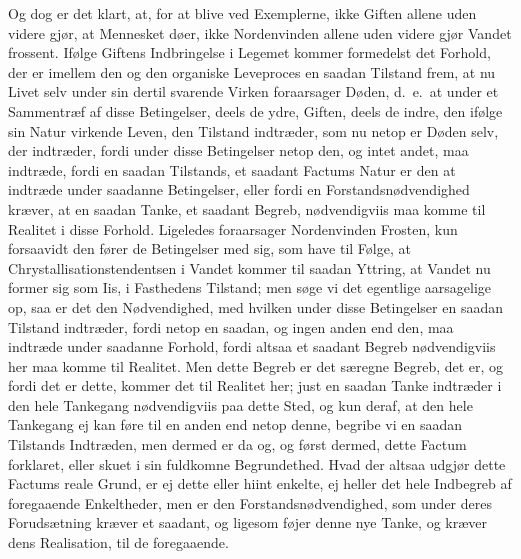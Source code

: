 \documentclass[12pt,a4paper]{book}
\newcommand{\apage}[1]{\marginnote{\footnotesize\textit{[#1]}}}
\begin{document}
Og dog er det klart, at, for at blive ved Exemplerne, ikke Giften allene uden
videre gjør, at Mennesket døer, ikke Nordenvinden allene uden videre gjør Vandet
frossent. Ifølge Giftens Indbringelse i Legemet kommer formedelst det Forhold, der
er imellem den og den organiske Leveproces en saadan Tilstand frem, at nu Livet
selv under sin dertil svarende Virken foraarsager Døden, d.\ e.\ at under et
Sammentræf af disse Betingelser, deels de ydre, Giften, deels de indre, den ifølge
sin Natur virkende Leven, den Tilstand indtræder, som nu netop er Døden selv, der
indtræder, fordi under disse Betingelser netop den, og intet andet, maa indtræde,
fordi en saadan Tilstands, et saadant Factums Natur er den at \apage{97} indtræde under saadanne Betingelser, eller fordi en Forstandsnødvendighed kræver, at en saadan Tanke, et saadant Begreb, nødvendigviis maa komme til Realitet i disse Forhold. Ligeledes foraarsager Nordenvinden Frosten, kun forsaavidt den fører de Betingelser med sig, som have til Følge, at Chrystallisationstendentsen i Vandet kommer til saadan Yttring, at Vandet nu former sig som Iis, i Fasthedens Tilstand; men søge vi det egentlige aarsagelige op, saa er det den Nødvendighed, med hvilken under disse Betingelser en saadan Tilstand indtræder, fordi netop en saadan, og ingen anden end den, maa indtræde under saadanne Forhold, fordi altsaa et saadant Begreb nødvendigviis her maa komme til Realitet. Men dette Begreb er det særegne Begreb, det er, og fordi det er dette, kommer det til Realitet her; just en saadan Tanke indtræder i den hele Tankegang nødvendigviis paa dette Sted, og kun deraf, at den hele Tankegang ej kan føre til en anden end netop denne, begribe vi en saadan Tilstands Indtræden, men dermed er da og, og først dermed, dette Factum forklaret, eller skuet i sin fuldkomne Begrundethed. Hvad der altsaa udgjør dette Factums reale Grund, er ej dette eller hiint enkelte, ej heller det hele Indbegreb af foregaaende Enkeltheder, men er den Forstandsnødvendighed, som under deres Forudsætning kræver \apage{98} et saadant, og
ligesom føjer denne nye Tanke, og kræver dens Realisation, til de foregaaende.
\end{document}
